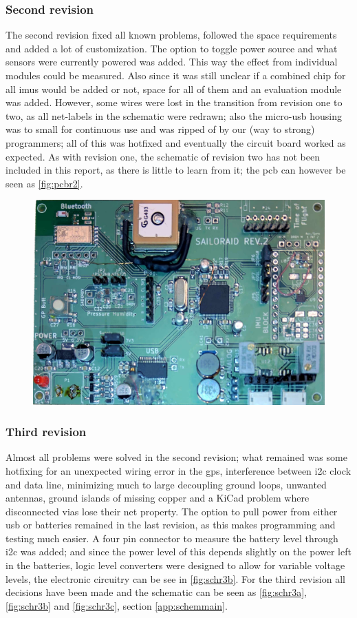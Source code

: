 \subsubsection{Second revision}
The second revision fixed all known problems, followed the space requirements and added a lot of customization. The option to toggle power source and what sensors were currently powered was added. This way the effect from individual modules could be measured. Also since it was still unclear if a combined chip for all \gls{imu}s would be added or not, space for all of them and an evaluation module was added. However, some wires were lost in the transition from revision one to two, as all net-labels in the schematic were redrawn; also the micro-\gls{usb} housing was to small for continuous use and was ripped of by our (way to strong) programmers; all of this was hotfixed and eventually the circuit board worked as expected. As with revision one, the schematic of revision two has not been included in this report, as there is little to learn from it; the \gls{pcb} can however be seen as \autoref{fig:pcbr2}.
\begin{figure}[H]
	\centering
	\includegraphics[width=.8\linewidth]{Figures/pcb_rev2.jpg}
	\label{fig:pcbr2}
\end{figure}

\subsubsection{Third revision}
Almost all problems were solved in the second revision; what remained was some hotfixing for an unexpected wiring error in the \gls{gps}, interference between \gls{i2c} clock and data line, minimizing much to large decoupling ground loops, unwanted antennas, ground islands of missing copper and a KiCad problem where disconnected \gls{via}s lose their net property. The option to pull power from either \gls{usb} or batteries remained in the last revision, as this makes programming and testing much easier. A four pin connector to measure the battery level through \gls{i2c} was added; and since the power level of this depends slightly on the power left in the batteries, logic level converters were designed to allow for variable voltage levels\cite{llc}, the electronic circuitry can be see in \autoref{fig:schr3b}.
For the third revision all decisions have been made and the schematic can be seen as \autoref{fig:schr3a}, \ref{fig:schr3b} and \ref{fig:schr3c}, section \ref{app:schemmain}.

